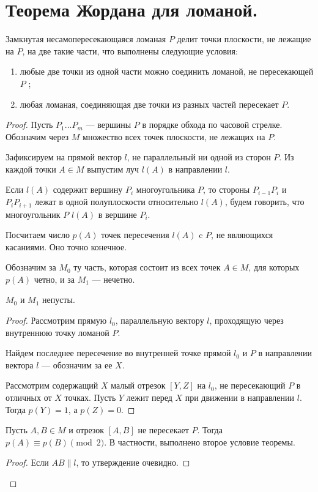 \section{Теорема Жордана для ломаной.}
\begin{theorem}[Жордан, 1887]
    Замкнутая несамопересекающаяся ломаная $P$ делит точки плоскости, не лежащие на $P$, на две такие части, что выполнены следующие условия:
	\begin{enumerate}[label=(\arabic*)]
		\item любые две точки из одной части можно соединить ломаной, не пересекающей $P$ ;
		\item любая ломаная, соединяющая две точки из разных частей пересекает $P$.
	\end{enumerate}
\end{theorem}
\begin{proof}
    Пусть $ P_1 \ldots P_m$ --- вершины $P$ в порядке обхода по часовой стрелке. Обозначим через $M$ множество всех точек плоскости, не лежащих на $P$.

	Зафиксируем на прямой вектор $l$, не параллельный ни одной из сторон $P$. Из каждой точки $A \in M$ выпустим луч $l(A)$ в направлении $l$.

	Если $l(A)$ содержит вершину $P_i$ многоугольника $P$, то стороны $P_{i-1}P_i$ и $P_iP_{i+1}$ лежат в одной полуплоскости относительно $l(A)$, будем говорить, что многоугольник $P$  $l(A) $ в вершине $P_i$.

	Посчитаем число $p(A)$ точек пересечения $l(A) $ c $P$, не являющихся касаниями. Оно точно конечное.

	Обозначим за $M_0$ ту часть, которая состоит из всех точек $A \in M$, для которых $p(A)$ четно, и за $M_1$ --- нечетно.

	\begin{statement}\label{st:planar_1}
	    $M_0$ и $M_1$ непусты.
	\end{statement}
	\begin{proof}
	    Рассмотрим прямую $l_0$, параллельную вектору $l$, проходящую через внутреннюю точку ломаной $P$.

		Найдем последнее пересечение во внутренней точке прямой $l_0$ и $P$ в направлении вектора $l$ --- обозначим за ее $X$.

		Рассмотрим содержащий $X$ малый отрезок $[Y, Z]$ на $l_0$, не пересекающий $P$ в отличных от $X$ точках. Пусть $Y$ лежит перед $X$ при движении в направлении $l$. Тогда $p(Y) = 1$, а $p(Z) = 0$.
	\end{proof}
	\begin{statement}\label{st:planar_2}
		Пусть $A, B \in M$ и отрезок $[A, B]$ не пересекает $P$. Тогда $p(A) \equiv p(B) \pmod 2$.  В частности, выполнено второе условие теоремы.
	\end{statement}
	\begin{proof}
	    Если $AB \parallel l$, то утверждение очевидно.


\end{proof}
\end{proof}
